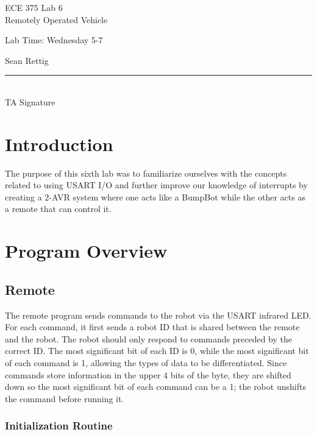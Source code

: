 \documentclass[12pt,letterpaper]{article}
\begin{document}
\begin{titlepage}
    \vspace*{4cm}
    \begin{flushright}
    {\huge
        ECE 375 Lab 6\\[1cm]
    }
    {\large
        Remotely Operated Vehicle
    }
    \end{flushright}
    \begin{flushleft}
    Lab Time: Wednesday 5-7
    \end{flushleft}
    \begin{flushright}
    Sean Rettig
    \vfill
    \rule{5in}{.5mm}\\
    TA Signature
    \end{flushright}

\end{titlepage}

\section{Introduction}

The purpose of this sixth lab was to familiarize ourselves with the concepts
related to using USART I/O and further improve our knowledge of interrupts by
creating a 2-AVR system where one acts like a BumpBot while the other acts as a
remote that can control it.

\section{Program Overview}

\subsection{Remote}

The remote program sends commands to the robot via the USART infrared LED.  For
each command, it first sends a robot ID that is shared between the remote and
the robot.  The robot should only respond to commands preceded by the correct
ID.  The most significant bit of each ID is 0, while the most significant bit
of each command is 1, allowing the types of data to be differentiated.  Since
commands store information in the upper 4 bits of the byte, they are shifted
down so the most significant bit of each command can be a 1; the robot unshifts
the command before running it.

\subsubsection{Initialization Routine}
\end{document}
